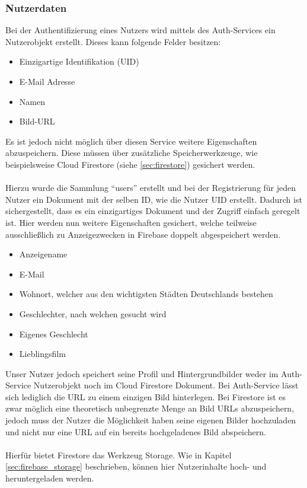 \subsubsection{Nutzerdaten}
Bei der Authentifizierung eines Nutzers wird mittels des Auth-Services ein Nutzerobjekt erstellt.
Dieses kann folgende Felder besitzen:
\begin{itemize}
	\item Einzigartige Identifikation (UID)
	\item E-Mail Adresse
	\item Namen
	\item Bild-URL
\end{itemize}
Es ist jedoch nicht möglich über diesen Service weitere Eigenschaften abzuspeichern.
Diese müssen über zusätzliche Speicherwerkzeuge, wie beispielsweise Cloud Firestore (siehe \ref{sec:firestore}) gesichert werden.\\
\\
Hierzu wurde die Sammlung \enquote{users} erstellt und bei der Registrierung für jeden Nutzer ein Dokument mit der selben ID, wie die Nutzer UID erstellt. 
Dadurch ist sichergestellt, dass es ein einzigartiges Dokument und der Zugriff einfach geregelt ist.
Hier werden nun weitere Eigenschaften gesichert, welche teilweise ausschließlich zu Anzeigezwecken in Firebase doppelt abgespeichert werden.
\begin{itemize}
	\item Anzeigename
	\item E-Mail
	\item Wohnort, welcher aus den wichtigsten Städten Deutschlands bestehen
	\item Geschlechter, nach welchen gesucht wird
	\item Eigenes Geschlecht
	\item Lieblingsfilm
\end{itemize}
Unser Nutzer jedoch speichert seine Profil und Hintergrundbilder weder im Auth-Service Nutzerobjekt noch im Cloud Firestore Dokument.
Bei Auth-Service lässt sich lediglich die URL zu einem einzigen Bild hinterlegen.
Bei Firestore ist es zwar möglich eine theoretisch unbegrenzte Menge an Bild URLs abzuspeichern, jedoch muss der Nutzer die Möglichkeit haben seine eigenen Bilder hochzuladen und nicht nur eine URL auf ein bereits hochgeladenes Bild abspeichern.\\
\\
Hierfür bietet Firestore das Werkzeug Storage. 
Wie in Kapitel \ref{sec:firebase_storage} beschrieben, können hier Nutzerinhalte hoch- und heruntergeladen werden. 
